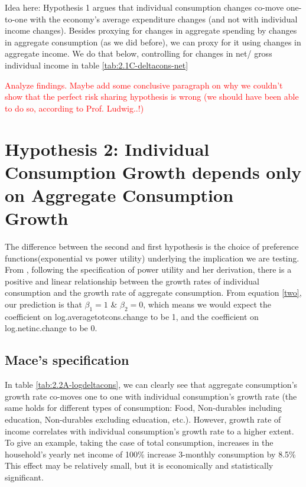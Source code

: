 \documentclass[12pt,a4paper]{article}
\begin{document}
Idea here: Hypothesis 1 argues that individual consumption changes co-move one-to-one with the economy's average expenditure changes (and not with individual income changes). Besides proxying for changes in aggregate spending by changes in aggregate consumption (as we did before), we can proxy for it using changes in aggregate income. We do that below, controlling for changes in net/ gross individual income in table \ref{tab:2.1C-deltacons-net}



\textcolor{red}{Analyze findings. Maybe add some conclusive paragraph on why we couldn't show that the perfect risk sharing hypothesis is wrong (we should have been able to do so, according to Prof. Ludwig..!)}

\section*{Hypothesis 2: Individual Consumption Growth depends only on Aggregate Consumption Growth}
The difference between the second and first hypothesis is the choice of preference functions(exponential vs power utility) underlying the implication we are testing. From \citealp{mace1991}, following the specification of power utility and her derivation, there is a positive and linear relationship between the growth rates of individual consumption and the growth rate of aggregate consumption. From equation \eqref{two}, our prediction is that $\beta_1=1$ \& $\beta_2=0$, which means we would expect the coefficient on log.averagetotcons.change to be 1, and the coefficient on log.netinc.change to be 0. 

\subsection*{Mace's specification}

In table \ref{tab:2.2A-logdeltacons}, we can clearly see that aggregate consumption's growth rate co-moves one to one with individual consumption's growth rate (the same holds for different types of consumption: Food, Non-durables including education, Non-durables excluding education, etc.). However,  growth rate of income correlates with individual consumption's growth rate to a higher extent. To give an example, taking the case of total consumption, increases in the household's yearly net income of 100\% increase 3-monthly consumption by 8.5\% This effect may be relatively small, but it is economically and statistically significant.  \\
\end{document}
